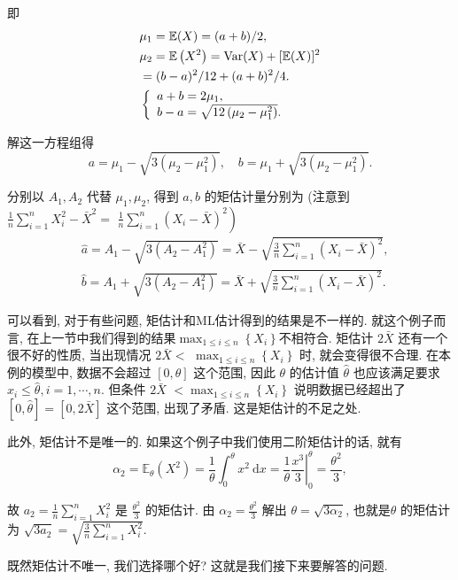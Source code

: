 \begin{solution}
    即
    $$
    \begin{aligned}
    & \mu_1=\mathbb E(X)=(a+b) / 2, \\
    & \mu_2=\mathbb E\left(X^2\right)=\operatorname{Var}(X)+[\mathbb E(X)]^2 \\
    &=(b-a)^2 / 12+(a+b)^2 / 4 . \\
    &\left\{\begin{array}{l}
    a+b=2 \mu_1, \\
    b-a=\sqrt{12\left(\mu_2-\mu_1^2\right)} .
    \end{array}\right.
    \end{aligned}
    $$
    
    解这一方程组得
    $$
    a=\mu_1-\sqrt{3\left(\mu_2-\mu_1^2\right)}, \quad b=\mu_1+\sqrt{3\left(\mu_2-\mu_1^2\right)} .
    $$

    分别以 $A_1, A_2$ 代替 $\mu_1, \mu_2$, 得到 $a, b$ 的矩估计量分别为 (注意到 $\frac{1}{n} \sum_{i=1}^n X_i^2-\bar{X}^2=$ $\left.\frac{1}{n} \sum_{i=1}^n\left(X_i-\bar{X}\right)^2\right)$
$$
\begin{aligned}
& \hat{a}=A_1-\sqrt{3\left(A_2-A_1^2\right)}=\bar{X}-\sqrt{\frac{3}{n} \sum_{i=1}^n\left(X_i-\bar{X}\right)^2}, \\
& \hat{b}=A_1+\sqrt{3\left(A_2-A_1^2\right)}=\bar{X}+\sqrt{\frac{3}{n} \sum_{i=1}^n\left(X_i-\bar{X}\right)^2} .
\end{aligned}
$$
\end{solution}

可以看到, 对于有些问题, 矩估计和ML估计得到的结果是不一样的. 就这个例子而言, 在上一节中我们得到的结果$\max _{1 \leq i \leq n}\left\{X_i\right\}$不相符合. 矩估计 $2 \bar{X}$ 还有一个很不好的性质, 当出现情况 $2 \bar{X}<$ $\max _{1 \leq i \leq n}\left\{X_i\right\}$ 时, 就会变得很不合理. 在本例的模型中, 数据不会超过 $[0, \theta]$ 这个范围, 因此 $\theta$ 的估计值 $\hat{\theta}$ 也应该满足要求 $x_i \leq \hat{\theta}, i=1, \cdots, n$. 但条件 $2 \bar{X}$ $<\max _{1 \leq i \leq n}\left\{X_i\right\}$ 说明数据已经超出了 $[0, \hat{\theta}]=[0,2 \bar{X}]$ 这个范围, 出现了矛盾. 这是矩估计的不足之处.

此外, 矩估计不是唯一的. 如果这个例子中我们使用二阶矩估计的话, 就有
$$
\alpha_2=\mathbb{E}_\theta\left(X^2\right)=\frac{1}{\theta} \int_0^\theta x^2 \mathrm{~d} x=\left.\frac{1}{\theta} \frac{x^3}{3}\right|_0 ^\theta=\frac{\theta^2}{3},
$$

故 $a_2=\frac{1}{n} \sum_{i=1}^n X_i^2$ 是 $\frac{\theta^2}{3}$ 的矩估计. 由 $\alpha_2=\frac{\theta^2}{3}$ 解出 $\theta=\sqrt{3 \alpha_2}$, 也就是$\theta$ 的矩估计为 $\sqrt{3 a_2}=\sqrt{\frac{3}{n} \sum_{i=1}^n X_i^2}$.

既然矩估计不唯一, 我们选择哪个好? 这就是我们接下来要解答的问题.  
